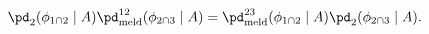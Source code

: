 \begin{equation}
  \pd_{2}(\phi_{1 \cap 2} \mid A) \pd_{\text{meld}}^{12}(\phi_{2 \cap 3} \mid A) 
  = 
  \pd_{\text{meld}}^{23}(\phi_{1 \cap 2} \mid A) \pd_{2}(\phi_{2 \cap 3} \mid A).
  \label{eqn:conditional-commutativity-target-equality}
\end{equation}